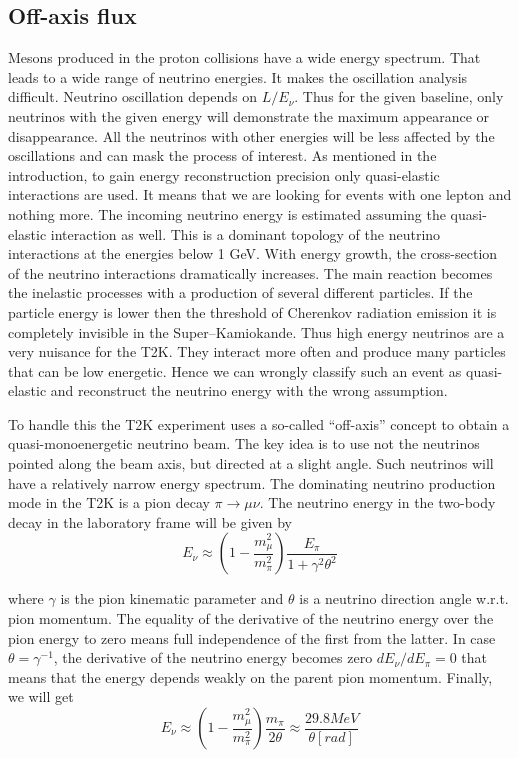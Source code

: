 \documentclass[../main.tex]{subfiles}
\begin{document}
\subsection{Off-axis flux}
\label{sec:T2K:oa_flux}
Mesons produced in the proton collisions have a wide energy spectrum. That leads to a wide range of neutrino energies. It makes the oscillation analysis difficult. Neutrino oscillation depends on $L/E_\nu$. Thus for the given baseline, only neutrinos with the given energy will demonstrate the maximum appearance or disappearance. All the neutrinos with other energies will be less affected by the oscillations and can mask the process of interest. As mentioned in the introduction, to gain energy reconstruction precision only quasi-elastic interactions are used. It means that we are looking for events with one lepton and nothing more. The incoming neutrino energy is estimated assuming the quasi-elastic interaction as well. This is a dominant topology of the neutrino interactions at the energies below 1 GeV. With energy growth, the cross-section of the neutrino interactions dramatically increases. The main reaction becomes the inelastic processes with a production of several different particles. If the particle energy is lower then the threshold of Cherenkov radiation emission it is completely invisible in the Super--Kamiokande. Thus high energy neutrinos are a very nuisance for the T2K. They interact more often and produce many particles that can be low energetic. Hence we can wrongly classify such an event as quasi-elastic and reconstruct the neutrino energy with the wrong assumption.

To handle this the T2K experiment uses a so-called ``off-axis'' concept to obtain a quasi-monoenergetic neutrino beam. The key idea is to use not the neutrinos pointed along the beam axis, but directed at a slight angle. Such neutrinos will have a relatively narrow energy spectrum. The dominating neutrino production mode in the T2K is a pion decay $\pi\to\mu\nu$. The neutrino energy in the two-body decay in the laboratory frame will be given by
\begin{equation}
E_\nu\approx\left(1-\frac{m_\mu^2}{m_\pi^2}\right)\frac{E_\pi}{1+\gamma^2\theta^2}
\end{equation}

where $\gamma$ is the pion kinematic parameter and $\theta$ is a neutrino direction angle w.r.t. pion momentum. The equality of the derivative of the neutrino energy over the pion energy to zero means full independence of the first from the latter. In case $\theta=\gamma^{-1}$, the derivative of the neutrino energy becomes zero $dE_\nu/dE_\pi=0$ that means that the energy depends weakly on the parent pion momentum. Finally, we will get
\begin{equation}
E_\nu\approx\left(1-\frac{m_\mu^2}{m_\pi^2}\right)\frac{m_\pi}{2\theta}\approx\frac{29.8MeV}{\theta\left[rad\right]}
\end{equation}
\end{document}
